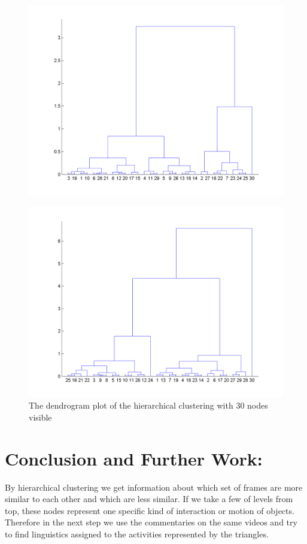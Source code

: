 \documentclass[11pt, twocolumn]{article}
\begin{document}
\begin{figure}[H]
\includegraphics[scale=0.3]{dendoChase.png} 
\begin{figure}[H]
\end{figure}
\includegraphics[scale=0.3]{dendoCoax.png}
\caption{The dendrogram plot of the hierarchical clustering with 30 nodes visible}
\end{figure}
\section*{Conclusion and Further Work:}
By hierarchical clustering we get information about which set of frames are more similar to each other and which are less similar. If we take a few of levels from top, these nodes represent one specific kind of interaction or motion of objects. Therefore in the next step we use the commentaries on the same videos and try to find linguistics assigned to the activities represented by the triangles.


\end{document}
